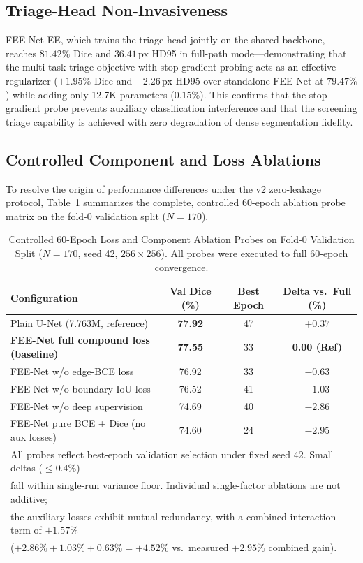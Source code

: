 \documentclass[journal]{IEEEtran}
\begin{document}
\subsection{Triage-Head Non-Invasiveness}
FEE-Net-EE, which trains the triage head jointly on the shared backbone, reaches $81.42\%$ Dice and $36.41$\,px HD95 in full-path mode---demonstrating that the multi-task triage objective with stop-gradient probing acts as an effective regularizer ($+1.95\%$ Dice and $-2.26$\,px HD95 over standalone FEE-Net at $79.47\%$) while adding only 12.7K parameters ($0.15\%$). This confirms that the stop-gradient probe prevents auxiliary classification interference and that the screening triage capability is achieved with zero degradation of dense segmentation fidelity.

\subsection{Controlled Component and Loss Ablations}
\label{ssec:ablation}
To resolve the origin of performance differences under the v2 zero-leakage protocol, Table~\ref{tab:probe_ablation} summarizes the complete, controlled 60-epoch ablation probe matrix on the fold-0 validation split ($N=170$).

\begin{table}[t]
\centering
\caption{Controlled 60-Epoch Loss and Component Ablation Probes on Fold-0 Validation Split ($N=170$, seed 42, $256\times 256$). All probes were executed to full 60-epoch convergence.}
\label{tab:probe_ablation}
\begin{tabular}{lccc}
\toprule
\textbf{Configuration} & \textbf{Val Dice (\%)} & \textbf{Best Epoch} & \textbf{Delta vs.\ Full (\%)} \\
\midrule
Plain U-Net (7.763M, reference) & \textbf{77.92} & 47 & $+0.37$ \\
\textbf{FEE-Net full compound loss (baseline)} & \textbf{77.55} & 33 & \textbf{0.00 (Ref)} \\
FEE-Net w/o edge-BCE loss & 76.92 & 33 & $-0.63$ \\
FEE-Net w/o boundary-IoU loss & 76.52 & 41 & $-1.03$ \\
FEE-Net w/o deep supervision & 74.69 & 40 & $-2.86$ \\
FEE-Net pure BCE + Dice (no aux losses) & 74.60 & 24 & $-2.95$ \\
\bottomrule
\multicolumn{4}{l}{\footnotesize *All probes reflect best-epoch validation selection under fixed seed 42. Small deltas ($\le 0.4\%$)} \\
\multicolumn{4}{l}{\footnotesize fall within single-run variance floor. Individual single-factor ablations are not additive;} \\
\multicolumn{4}{l}{\footnotesize the auxiliary losses exhibit mutual redundancy, with a combined interaction term of $+1.57\%$} \\
\multicolumn{4}{l}{\footnotesize ($+2.86\% + 1.03\% + 0.63\% = +4.52\%$ vs.\ measured $+2.95\%$ combined gain).}
\end{tabular}
\end{table}
\end{document}
